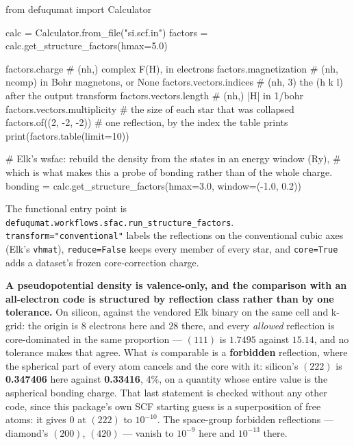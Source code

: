 \documentclass[11pt,a4paper]{article}
\newcommand{\code}[1]{\texttt{\small #1}}
\begin{document}
\begin{pycode}
from defuqumat import Calculator

calc = Calculator.from_file("si.scf.in")
factors = calc.get_structure_factors(hmax=5.0)

factors.charge               # (nh,) complex F(H), in electrons
factors.magnetization        # (nh, ncomp) in Bohr magnetons, or None
factors.vectors.indices      # (nh, 3) the (h k l) after the output transform
factors.vectors.length       # (nh,) |H| in 1/bohr
factors.vectors.multiplicity # the size of each star that was collapsed
factors.of((2, -2, -2))      # one reflection, by the index the table prints
print(factors.table(limit=10))

# Elk's wsfac: rebuild the density from the states in an energy window (Ry),
# which is what makes this a probe of bonding rather than of the whole charge.
bonding = calc.get_structure_factors(hmax=3.0, window=(-1.0, 0.2))
\end{pycode}

The functional entry point is \code{defuqumat.workflows.sfac.run\_structure\_factors}.
\code{transform="conventional"} labels the reflections on the conventional cubic
axes (Elk's \code{vhmat}), \code{reduce=False} keeps every member of every star,
and \code{core=True} adds a dataset's frozen core-correction charge.

\textbf{A pseudopotential density is valence-only, and the comparison with an
all-electron code is structured by reflection class rather than by one
tolerance.} On silicon, against the vendored Elk binary on the same cell and
k-grid: the origin is $8$ electrons here and $28$ there, and every
\emph{allowed} reflection is core-dominated in the same proportion --- $(111)$ is
$1.7495$ against $15.14$, and no tolerance makes that agree. What \emph{is}
comparable is a \textbf{forbidden} reflection, where the spherical part of every
atom cancels and the core with it: silicon's $(222)$ is \textbf{0.347406} here
against \textbf{0.33416}, 4\%, on a quantity whose entire value is the
aspherical bonding charge. That last statement is checked without any other
code, since this package's own SCF starting guess is a superposition of free
atoms: it gives $0$ at $(222)$ to $10^{-10}$. The space-group forbidden
reflections --- diamond's $(200)$, $(420)$ --- vanish to $10^{-9}$ here and
$10^{-13}$ there.
\end{document}
